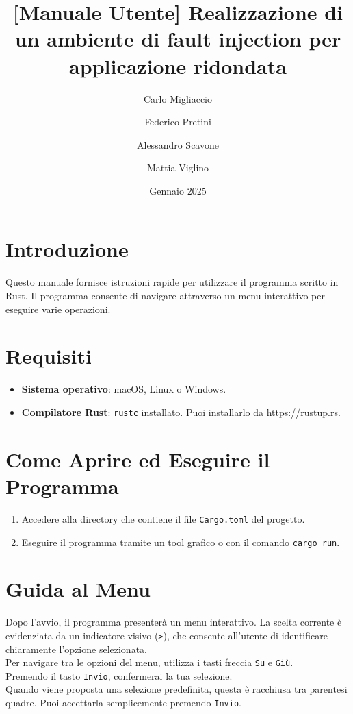 \documentclass{article}
\title{\textbf{[Manuale Utente] Realizzazione di un ambiente di fault injection per applicazione ridondata}}
\author{Carlo Migliaccio}
\author{Federico Pretini}
\author{Alessandro Scavone}
\author{Mattia Viglino}
\affil[1]{\small{Laurea Magistrale in Ingegneria Informatica, Politecnico di Torino}}
\date{Gennaio 2025}
\begin{document}
\renewcommand{\labelenumii}{\arabic{enumi}.\arabic{enumii}}

\maketitle
\thispagestyle{empty}
\vspace{-0.8cm}
\tableofcontents

\section*{Introduzione}
Questo manuale fornisce istruzioni rapide per utilizzare il programma scritto in Rust. Il programma consente di navigare attraverso un menu interattivo per eseguire varie operazioni.

\section*{Requisiti}
\begin{itemize}
\item \textbf{Sistema operativo}: macOS, Linux o Windows.
\item \textbf{Compilatore Rust}: \texttt{rustc} installato. Puoi installarlo da \url{https://rustup.rs}.
\end{itemize}

\section*{Come Aprire ed Eseguire il Programma}
\begin{enumerate}
\item Accedere alla directory che contiene il file \texttt{Cargo.toml} del progetto.
\item Eseguire il programma tramite un tool grafico o con il comando \texttt{cargo run}.
\end{enumerate}

\section*{Guida al Menu}
Dopo l'avvio, il programma presenterà un menu interattivo. La scelta corrente è evidenziata da un indicatore visivo (\texttt{>}), che consente all'utente di identificare chiaramente l'opzione selezionata. \\ 
Per navigare tra le opzioni del menu, utilizza i tasti freccia \texttt{Su} e \texttt{Giù}.\\
Premendo il tasto \texttt{Invio}, confermerai la tua selezione. \\ 
Quando viene proposta una selezione predefinita, questa è racchiusa tra parentesi quadre. Puoi accettarla semplicemente premendo \texttt{Invio}.
\end{document}

